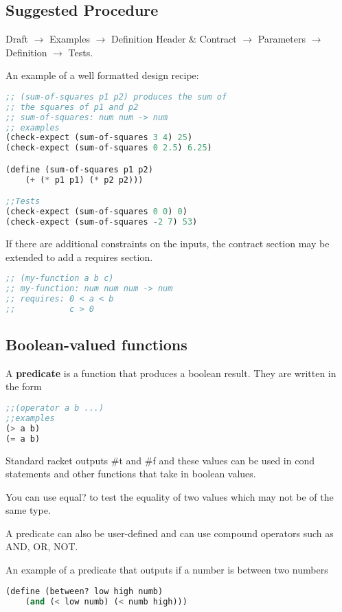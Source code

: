 \documentclass[english, 12pt]{article}
\begin{document}
\subsection{Suggested Procedure}
Draft $\rightarrow$ Examples $\rightarrow$ Definition Header \& Contract $\rightarrow$ Parameters $\rightarrow$ Definition $\rightarrow$ Tests.
\begin{exmp}
An example of a well formatted design recipe:
\begin{lstlisting}[language=Scheme]
;; (sum-of-squares p1 p2) produces the sum of 
;; the squares of p1 and p2
;; sum-of-squares: num num -> num
;; examples
(check-expect (sum-of-squares 3 4) 25)
(check-expect (sum-of-squares 0 2.5) 6.25)

(define (sum-of-squares p1 p2)
	(+ (* p1 p1) (* p2 p2)))

;;Tests
(check-expect (sum-of-squares 0 0) 0)
(check-expect (sum-of-squares -2 7) 53)
\end{lstlisting}
If there are additional constraints on the inputs, the contract section may
be extended to add a requires section.
\begin{lstlisting}[language=Scheme]
;; (my-function a b c)
;; my-function: num num num -> num
;; requires: 0 < a < b
;;			 c > 0
\end{lstlisting}
\end{exmp}
\subsection{Boolean-valued functions}
\begin{defn}
A \textbf{predicate} is a function that produces a boolean result. They are written in the form
\begin{lstlisting}[language=Scheme]
;;(operator a b ...)
;;examples
(> a b)
(= a b)
\end{lstlisting}
Standard racket outputs \#t and \#f and these values can be used in cond statements and other functions that take in boolean values.
\end{defn}
\begin{exmp}
You can use equal? to test the equality of two values which may not be of the same type.
\end{exmp}
\begin{note}
A predicate can also be user-defined and can use compound operators such as AND, OR, NOT. 
\end{note}

\begin{exmp}
An example of a predicate that outputs if a number is between two numbers
\begin{lstlisting}[language=Scheme]
(define (between? low high numb)
	(and (< low numb) (< numb high)))
\end{lstlisting}
\end{exmp}
\end{document}
